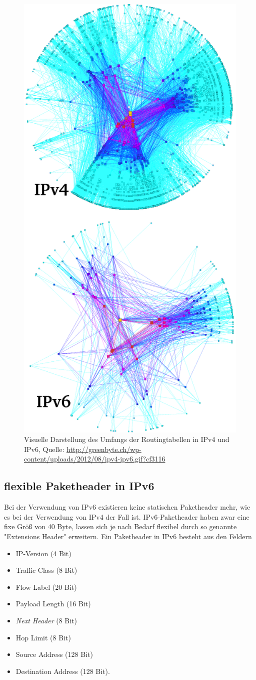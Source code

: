 \documentclass[a4paper,12pt]{scrartcl}
\begin{document}
\begin{figure}[htb]
\begin{center}
 \includegraphics[width=.5\hsize]{./images/ipv4v6map.png}
 \end{center}
\caption[Visuelle Darstellung des Umfangs der Routingtabellen in IPv4 und IPv6, Quelle: \url{http://greenbyte.ch/wp-content/uploads/2012/08/ipv4-ipv6.gif?cf3116}]{\label{ipv4v6map}Visuelle Darstellung des Umfangs der Routingtabellen in IPv4 und IPv6, Quelle: \url{http://greenbyte.ch/wp-content/uploads/2012/08/ipv4-ipv6.gif?cf3116}}
\end{figure}

\clearpage
\subsection{flexible Paketheader in IPv6}
 Bei der Verwendung von IPv6 existieren keine statischen Paketheader mehr, wie es bei der Verwendung von IPv4 der Fall ist. IPv6-Paketheader haben zwar eine fixe Gr\"o{\ss} von 40 Byte, lassen sich je nach Bedarf flexibel durch so genannte "Extensions Header" erweitern. 
Ein Paketheader in IPv6 besteht aus den Feldern 
\begin{itemize}
	\item IP-Version (4 Bit)
	\item Traffic Class (8 Bit)
	\item Flow Label (20 Bit)
	\item Payload Length (16 Bit)
	\item \textit{Next Header} (8 Bit)
	\item Hop Limit (8 Bit)
	\item Source Address (128 Bit)
	\item Destination Address (128 Bit). 
\end{itemize}
\end{document}
